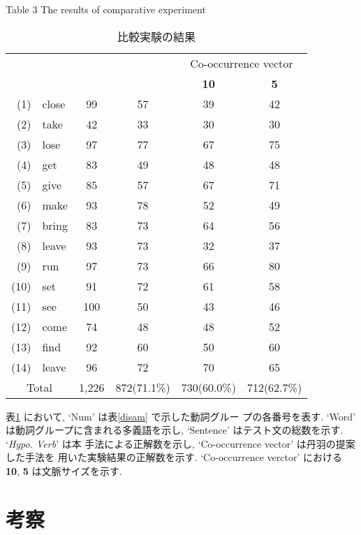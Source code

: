 {
\begin{table}[htbp]
\begin{center}
\caption{比較実験の結果} \label{poly_result1}
Table 3 The results of comparative experiment \\
\vspace*{2mm}
\begin{tabular}{r|l|c||c|c|c} \hline \hline
\raisebox{-1.5ex}{Num} &\raisebox{-1.5ex}{Word} &\raisebox{-1.5ex}{Sentence} &\raisebox{-1.5ex}{\it Hypo. Verb} &\multicolumn{2}{c}{Co-occurrence vector} \\ \cline{5-6}
 & & & &{\bf 10} &{\bf 5} \\ \hline 
(1) &close &99 &57 &39 &42 \\ \hline
(2) &take &42 &33 &30 &30 \\ \hline
(3) &lose &97 &77 &67 &75 \\ \hline
(4) &get &83 &49 &48 &48 \\ \hline
(5) &give &85 &57 &67 &71 \\ \hline
(6) &make &93 &78 &52 &49 \\ \hline
(7) &bring &83 &73 &64 &56 \\ \hline
(8) &leave &93 &73 &32 &37 \\ \hline
(9) &run &97 &73 &66 &80 \\ \hline
(10) &set &91 &72 &61 &58 \\ \hline
(11) &see &100 &50 &43 &46 \\ \hline
(12) &come &74 &48 &48 &52 \\ \hline
(13) &find &92 &60 &50 &60 \\ \hline
(14) &leave &96 &72 &70 &65 \\ \hline
\multicolumn{2}{c|}{Total} &1,226 &872(71.1\%) &730(60.0\%) &712(62.7\%) \\ \hline
\end{tabular}
\end{center}
\end{table}
}

\noindent
表\ref{poly_result1} において, `Num' は表\ref{disam} で示した動詞グルー
プの各番号を表す.  `Word' は動詞グループに含まれる多義語を示し,
`Sentence' はテスト文の総数を示す.  `{\it Hypo. Verb}' は本
手法による正解数を示し, `Co-occurrence vector' は丹羽の提案した手法を
用いた実験結果の正解数を示す. `Co-occurrence verctor' における {\bf
10}, {\bf 5} は文脈サイズを示す.


\section{考察}
